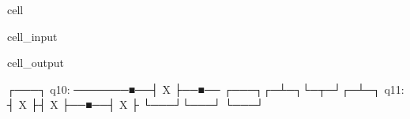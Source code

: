 \documentclass[letterpaper,10pt,english]{jupyterBook}
\begin{document}
\begin{sphinxuseclass}{cell}\begin{sphinxVerbatimInput}

\begin{sphinxuseclass}{cell_input}
\begin{sphinxVerbatim}[commandchars=\\\{\}]
  
  
\end{sphinxVerbatim}

\end{sphinxuseclass}\end{sphinxVerbatimInput}
\begin{sphinxVerbatimOutput}

\begin{sphinxuseclass}{cell_output}
\begin{sphinxVerbatim}[commandchars=\\\{\}]
                ┌───┐
q1\PYGZus{}0: ───────■──┤ X ├──■──
      ┌───┐┌─┴─┐└─┬─┘┌─┴─┐
q1\PYGZus{}1: ┤ X ├┤ X ├──■──┤ X ├
      └───┘└───┘     └───┘
\end{sphinxVerbatim}

\end{sphinxuseclass}\end{sphinxVerbatimOutput}

\end{sphinxuseclass}
\end{document}
